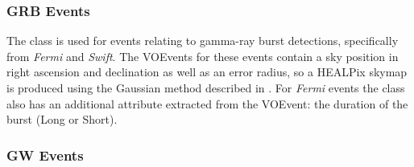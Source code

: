 \begin{colsection}
\subsubsection{GRB Events}

The  class is used for events relating to gamma-ray burst detections, specifically from \textit{Fermi} and \textit{Swift}. The VOEvents for these events contain a sky position in right ascension and declination as well as an error radius, so a HEALPix skymap is produced using the Gaussian method described in . For \textit{Fermi} events the class also has an additional attribute extracted from the VOEvent: the duration of the burst (Long or Short).

\subsubsection{GW Events}


\end{colsection}
